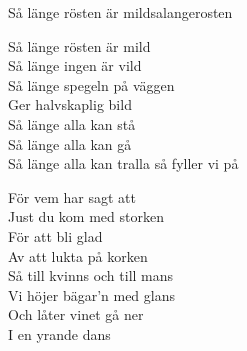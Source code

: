 \begin{song}{Så länge rösten är mild}{salangerosten}
\begin{vers}
Så länge rösten är mild\\
Så länge ingen är vild\\
Så länge spegeln på väggen\\
Ger halvskaplig bild\\
Så länge alla kan stå\\
Så länge alla kan gå\\
Så länge alla kan tralla så fyller vi på\\
\end{vers}
\begin{vers}
För vem har sagt att\\
Just du kom med storken\\
För att bli glad\\
Av att lukta på korken\\
Så till kvinns och till mans\\
Vi höjer bägar'n med glans\\
Och låter vinet gå ner\\
I en yrande dans\\
\end{vers}
\end{song}
